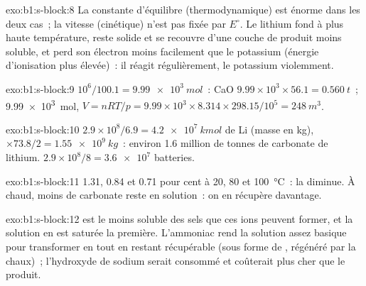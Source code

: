 \begin{solution}{exo:b1:s-block:8}
La constante d'équilibre (thermodynamique) est énorme dans les deux
cas~; la vitesse (cinétique) n'est pas fixée par $E^\circ$. Le lithium
fond à plus haute température, reste solide et se recouvre d'une couche
de produit moins soluble, et perd son électron moins facilement que le
potassium (énergie d'ionisation plus élevée)~: il réagit
régulièrement, le potassium violemment.
\end{solution}

\begin{solution}{exo:b1:s-block:9}
$10^6/100.1 = \qty{9.99e3}{mol}$~: CaO $9.99 \times 10^3 \times 56.1 =
\qty{0.560}{t}$~;  \qty{9.99e3}{mol}, $V = nRT/p = 9.99 \times 10^3
\times 8.314 \times 298.15/10^5 = \qty{248}{m^3}$.
\end{solution}

\begin{solution}{exo:b1:s-block:10}
$2.9 \times 10^8/6.9 = \qty{4.2e7}{kmol}$ de Li (masse en kg), $\times 73.8/2 =
\qty{1.55e9}{kg}$~: environ 1.6 million de tonnes de carbonate de
lithium.
$2.9 \times 10^8/8 = \num{3.6e7}$ batteries.
\end{solution}

\begin{solution}{exo:b1:s-block:11}
1.31, 0.84 et 0.71 pour cent à 20, 80 et \qty{100}{\celsius}~: la
 diminue. À chaud, moins de carbonate reste en solution~: on
en récupère davantage.
\end{solution}

\begin{solution}{exo:b1:s-block:12}
 est le moins soluble des sels que ces ions peuvent former, et
la solution en est saturée la première. L'ammoniac rend la solution
assez basique pour transformer  en  tout en restant
récupérable (sous forme de , régénéré par la chaux)~;
l'hydroxyde de sodium serait consommé et coûterait plus cher que le
produit.
\end{solution}

